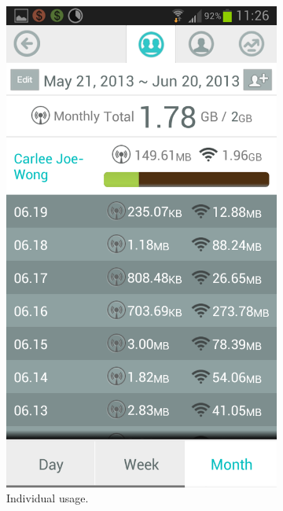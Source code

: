 \begin{figure}
	\begin{subfigure}[b]{0.23\textwidth}
	\includegraphics[width = \textwidth]{Figures/Usage.png}
	\caption{Individual usage.}
	\label{fig:datawiz_indv}
	\end{subfigure}
	\begin{subfigure}[b]{0.23\textwidth}

\end{subfigure}
\end{figure}
